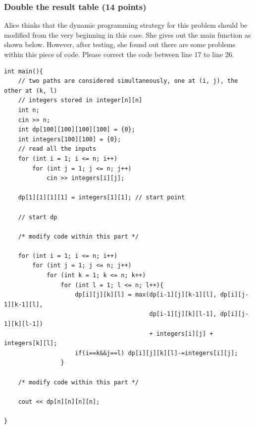 \documentclass[11pt]{exam}
\begin{document}
\subsubsection{Double the result table (14 points)}
Alice thinks that the dynamic programming strategy for this problem should be modified from the very beginning in this case. She gives out the main function as shown below. However, after testing, she found out there are some problems within this piece of code. Please correct the code between line 17 to line 26.
\newpage 
\begin{lstlisting}
int main(){
    // two paths are considered simultaneously, one at (i, j), the other at (k, l)
    // integers stored in integer[n][n]
    int n;
    cin >> n;
    int dp[100][100][100][100] = {0};
    int integers[100][100] = {0};
    // read all the inputs
    for (int i = 1; i <= n; i++)
        for (int j = 1; j <= n; j++)
            cin >> integers[i][j];
    
    dp[1][1][1][1] = integers[1][1]; // start point
    
    // start dp
    
    /* modify code within this part */

    for (int i = 1; i <= n; i++)
        for (int j = 1; j <= n; j++)
            for (int k = 1; k <= n; k++)
                for (int l = 1; l <= n; l++){
                    dp[i][j][k][l] = max(dp[i-1][j][k-1][l], dp[i][j-1][k-1][l],
                                         dp[i-1][j][k][l-1], dp[i][j-1][k][l-1])
                                         + integers[i][j] + integers[k][l];
                    if(i==k&&j==l) dp[i][j][k][l]-=integers[i][j];
                }                         
                                         
    /* modify code within this part */
    
    cout << dp[n][n][n][n];
    
}
\end{lstlisting}
\end{document}
